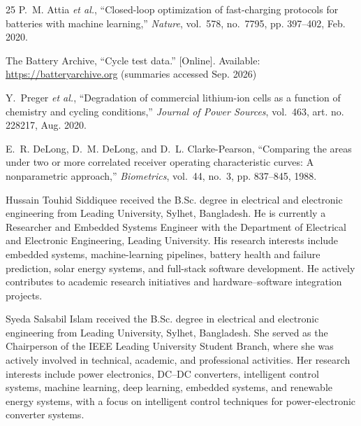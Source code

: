 \begin{thebibliography}{25}
P.~M. Attia \emph{et al.}, ``Closed-loop optimization of fast-charging protocols for batteries with machine learning,'' \emph{Nature}, vol.~578, no.~7795, pp. 397--402, Feb. 2020.

The Battery Archive, ``Cycle test data.'' [Online]. Available: \url{https://batteryarchive.org} (summaries accessed Sep. 2026)

Y.~Preger \emph{et al.}, ``Degradation of commercial lithium-ion cells as a function of chemistry and cycling conditions,'' \emph{Journal of Power Sources}, vol.~463, art. no. 228217, Aug. 2020.

E.~R. DeLong, D.~M. DeLong, and D.~L. Clarke-Pearson, ``Comparing the areas under two or more correlated receiver operating characteristic curves: A nonparametric approach,'' \emph{Biometrics}, vol.~44, no.~3, pp. 837--845, 1988.

\end{thebibliography}

\begin{IEEEbiographynophoto}{Hussain Touhid Siddiquee}
received the B.Sc. degree in electrical and electronic engineering from Leading University, Sylhet, Bangladesh. He is currently a Researcher and Embedded Systems Engineer with the Department of Electrical and Electronic Engineering, Leading University. His research interests include embedded systems, machine-learning pipelines, battery health and failure prediction, solar energy systems, and full-stack software development. He actively contributes to academic research initiatives and hardware--software integration projects.
\end{IEEEbiographynophoto}

\begin{IEEEbiographynophoto}{Syeda Salsabil Islam}
received the B.Sc. degree in electrical and electronic engineering from Leading University, Sylhet, Bangladesh. She served as the Chairperson of the IEEE Leading University Student Branch, where she was actively involved in technical, academic, and professional activities. Her research interests include power electronics, DC--DC converters, intelligent control systems, machine learning, deep learning, embedded systems, and renewable energy systems, with a focus on intelligent control techniques for power-electronic converter systems.
\end{IEEEbiographynophoto}

